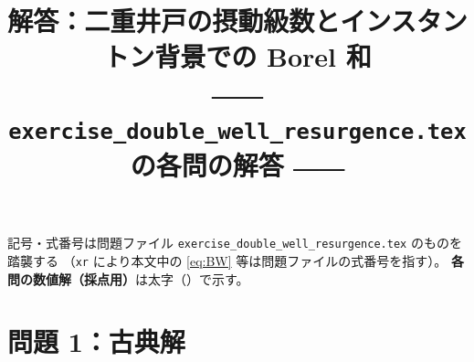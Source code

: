 \documentclass[dvipdfmx, uplatex]{jsarticle}
\title{解答：二重井戸の摂動級数とインスタントン背景での Borel 和\\
\large ―― \texttt{exercise\_double\_well\_resurgence.tex} の各問の解答 ――}
\author{}
\date{}
\theoremstyle{definition}
\begin{document}
\maketitle
\vspace{-6zh}

記号・式番号は問題ファイル \texttt{exercise\_double\_well\_resurgence.tex} のものを踏襲する
（\texttt{xr} により本文中の \eqref{eq:BW} 等は問題ファイルの式番号を指す）。
\textbf{各問の数値解（採点用）}は太字（\boxed）で示す。

\tableofcontents

\section{問題 1：古典解}
\end{document}

